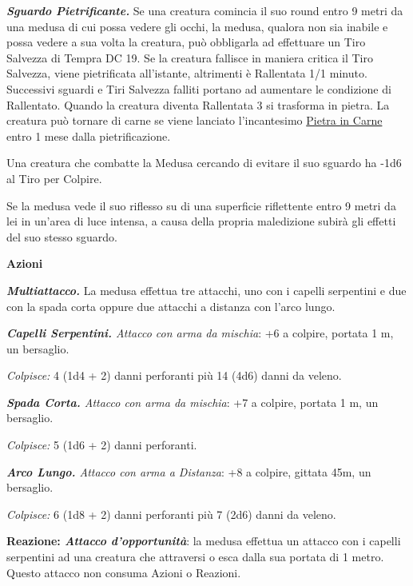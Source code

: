 \begin{multicols}{2}
{\emph{\textbf{Sguardo Pietrificante.}} Se una creatura comincia il suo round entro 9 metri da una medusa di cui possa vedere gli occhi, la medusa, qualora non sia inabile e possa vedere a sua volta la creatura, può obbligarla ad effettuare un Tiro Salvezza di Tempra DC 19. Se la creatura fallisce in maniera critica il Tiro Salvezza, viene pietrificata all'istante, altrimenti è Rallentata 1/1 minuto. Successivi sguardi e Tiri Salvezza falliti portano ad aumentare le condizione di Rallentato. Quando la creatura diventa Rallentata 3 si trasforma in pietra. La creatura può tornare di carne se viene lanciato l'incantesimo \hyperlink{Pietra in Carne}{Pietra in Carne} entro 1 mese dalla pietrificazione.

Una creatura che combatte la Medusa cercando di evitare il suo sguardo ha -1d6 al Tiro per Colpire.

Se la medusa vede il suo riflesso su di una superficie riflettente entro 9 metri da lei in un'area di luce intensa, a causa della propria maledizione subirà gli effetti del suo stesso sguardo.

\textbf{Azioni}

\emph{\textbf{Multiattacco.}} La medusa effettua tre attacchi, uno con i capelli serpentini e due con la spada corta oppure due attacchi a distanza con l'arco lungo.

\emph{\textbf{Capelli Serpentini.} Attacco con arma da mischia}: +6 a colpire, portata 1 m, un bersaglio.

\emph{Colpisce:} 4 (1d4 + 2) danni perforanti più 14 (4d6) danni da veleno.

\emph{\textbf{Spada Corta.} Attacco con arma da mischia}: +7 a colpire, portata 1 m, un bersaglio.

\emph{Colpisce:} 5 (1d6 + 2) danni perforanti.

\emph{\textbf{Arco Lungo.} Attacco con arma a Distanza}: +8 a colpire, gittata 45m, un bersaglio.

\emph{Colpisce:} 6 (1d8 + 2) danni perforanti più 7 (2d6) danni da veleno.

\textbf{Reazione: \emph{Attacco d'opportunità}}: la medusa effettua un attacco con i capelli serpentini ad una creatura che attraversi o esca dalla sua portata di 1 metro. Questo attacco non consuma Azioni o Reazioni.

}
\end{multicols}
